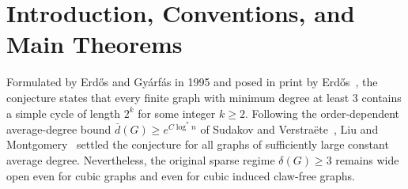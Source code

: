 \documentclass[11pt,reqno]{amsart}
\theoremstyle{plain}
\theoremstyle{definition}
\theoremstyle{remark}
\newcommand{\EG}{\text{Erd\H{o}s--Gy\'arf\'as}}
\DeclareRobustCommand{\_}{\ifmmode\text{\textunderscore}\else\textunderscore\allowbreak\fi}
\begin{document}
\section{Introduction, Conventions, and Main Theorems}\label{sec:intro}

Formulated by Erd\H{o}s and Gy\'arf\'as in 1995 and posed in print by Erd\H{o}s~\cite{Erdos1997}, the \EG{} conjecture states that every finite graph with minimum degree at least $3$ contains a simple cycle of length $2^k$ for some integer $k \ge 2$. Following the order-dependent average-degree bound $\bar{d}(G) \ge e^{C \log^* n}$ of Sudakov and Verstra\"ete~\cite{SudakovVerstraete2008}, Liu and Montgomery~\cite{LiuMontgomery2023} settled the conjecture for all graphs of sufficiently large constant average degree. Nevertheless, the original sparse regime $\delta(G) \ge 3$ remains wide open even for cubic graphs and even for cubic induced claw-free graphs.
\end{document}

